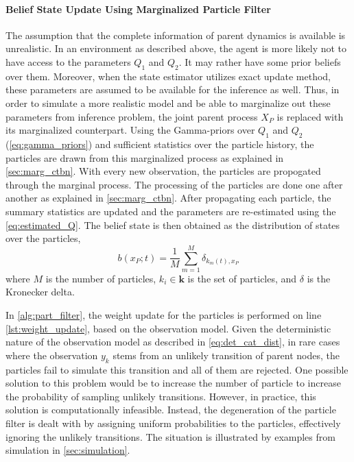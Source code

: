 \paragraph*{Belief State Update Using Marginalized Particle Filter}
\label{par:bs_partFilt}
The assumption that the complete information of parent dynamics is available is unrealistic. In an environment as described above, the agent is more likely not to have access to the parameters $ Q_1 $ and $ Q_2 $. It may rather have some prior beliefs over them. Moreover, when the state estimator utilizes exact update method, these parameters are assumed to be available for the inference as well. Thus, in order to simulate a more realistic model and be able to marginalize out these parameters from inference problem, the joint parent process $ X_P $ is replaced with its marginalized counterpart. Using the Gamma-priors over $ Q_1 $ and $ Q_2 $ (\autoref{eq:gamma_priors}) and sufficient statistics over the particle history, the particles are drawn from this marginalized process as explained in \cref{sec:marg_ctbn}. With every new observation, the particles are propogated through the marginal process. The processing of the particles are done one after another as explained in \cref{sec:marg_ctbn}. After propagating each particle, the summary statistics are updated and the parameters are re-estimated using the \autoref{eq:estimated_Q}. The belief state is then obtained as the distribution of states over the particles,
\begin{equation}
b(x_P; t) = \frac{1}{M} \sum_{m=1}^{M} \delta_{k_m(t), x_P}
\label{eq:belief_over_particles}
\end{equation}
where $ M $ is the number of particles, $ k_i \in \textbf{k} $ is the set of particles, and $\delta$ is the Kronecker delta.\par
In \cref{alg:part_filter}, the weight update for the particles is performed on line \autoref{lst:weight_update}, based on the observation model. Given the deterministic nature of the observation model as described in \autoref{eq:det_cat_dist}, in rare cases where the observation $ y_k $ stems from an unlikely transition of parent nodes, the particles fail to simulate this transition and all of them are rejected. One possible solution to this problem would be to increase the number of particle to increase the probability of sampling unlikely transitions. However, in practice, this solution is computationally infeasible. Instead, the degeneration of the particle filter is dealt with by assigning uniform probabilities to the particles, effectively ignoring the unlikely transitions. The situation is illustrated by examples from simulation in \cref{sec:simulation}.\\\\\\\\\\\\
